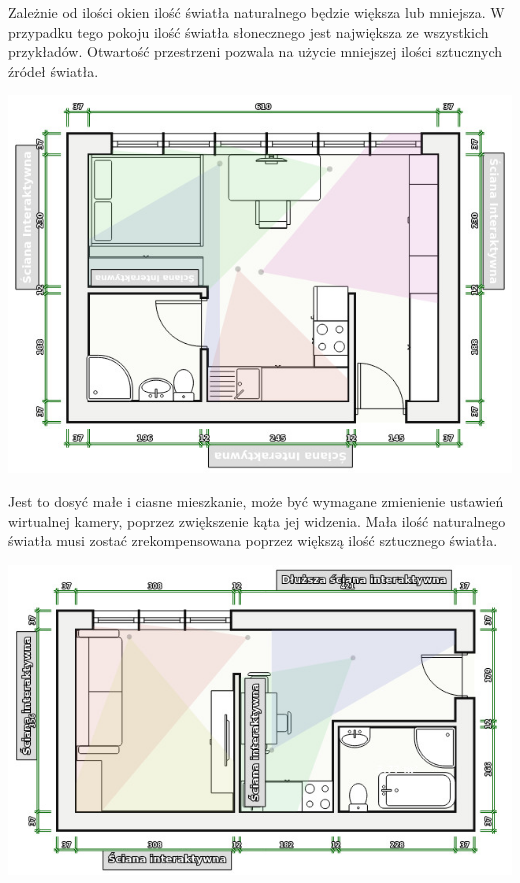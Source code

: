 \documentclass{article} %
\begin{document}
        Zależnie od ilości okien ilość światła naturalnego będzie większa lub mniejsza. W przypadku tego pokoju ilość światła słonecznego jest największa ze wszystkich przykładów. Otwartość przestrzeni pozwala na użycie mniejszej ilości sztucznych źródeł światła.
        \\
        \begin{center}
            \includegraphics[scale=0.5]{images/diagrams/kawalerka2.jpeg}
        \end{center}
        
        
        Jest to dosyć małe i ciasne mieszkanie, może być wymagane zmienienie ustawień wirtualnej kamery, poprzez zwiększenie kąta jej widzenia. Mała ilość naturalnego światła musi zostać zrekompensowana poprzez większą ilość sztucznego światła.
        \\
        \begin{center}
            \includegraphics[scale=0.5]{images/diagrams/kawalerka3.jpeg}
        \end{center}
        
\end{document}
